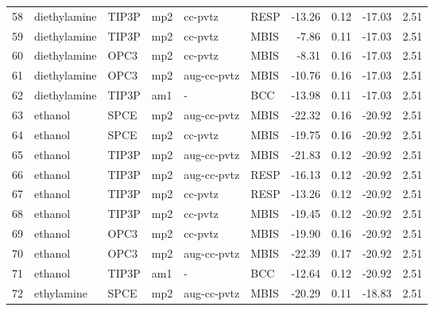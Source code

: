 \begin{tabular}{llllllrrrr}
58  &                   diethylamine &      TIP3P &      mp2 &      cc-pvtz &         RESP & -13.26 &      0.12 &      -17.03 &     2.51 \\
59  &                   diethylamine &      TIP3P &      mp2 &      cc-pvtz &         MBIS &  -7.86 &      0.11 &      -17.03 &     2.51 \\
60  &                   diethylamine &       OPC3 &      mp2 &      cc-pvtz &         MBIS &  -8.31 &      0.16 &      -17.03 &     2.51 \\
61  &                   diethylamine &       OPC3 &      mp2 &  aug-cc-pvtz &         MBIS & -10.76 &      0.16 &      -17.03 &     2.51 \\
62  &                   diethylamine &      TIP3P &      am1 &            - &          BCC & -13.98 &      0.11 &      -17.03 &     2.51 \\
63  &                        ethanol &       SPCE &      mp2 &  aug-cc-pvtz &         MBIS & -22.32 &      0.16 &      -20.92 &     2.51 \\
64  &                        ethanol &       SPCE &      mp2 &      cc-pvtz &         MBIS & -19.75 &      0.16 &      -20.92 &     2.51 \\
65  &                        ethanol &      TIP3P &      mp2 &  aug-cc-pvtz &         MBIS & -21.83 &      0.12 &      -20.92 &     2.51 \\
66  &                        ethanol &      TIP3P &      mp2 &  aug-cc-pvtz &         RESP & -16.13 &      0.12 &      -20.92 &     2.51 \\
67  &                        ethanol &      TIP3P &      mp2 &      cc-pvtz &         RESP & -13.26 &      0.12 &      -20.92 &     2.51 \\
68  &                        ethanol &      TIP3P &      mp2 &      cc-pvtz &         MBIS & -19.45 &      0.12 &      -20.92 &     2.51 \\
69  &                        ethanol &       OPC3 &      mp2 &      cc-pvtz &         MBIS & -19.90 &      0.16 &      -20.92 &     2.51 \\
70  &                        ethanol &       OPC3 &      mp2 &  aug-cc-pvtz &         MBIS & -22.39 &      0.17 &      -20.92 &     2.51 \\
71  &                        ethanol &      TIP3P &      am1 &            - &          BCC & -12.64 &      0.12 &      -20.92 &     2.51 \\
72  &                     ethylamine &       SPCE &      mp2 &  aug-cc-pvtz &         MBIS & -20.29 &      0.11 &      -18.83 &     2.51 \\

\end{tabular}
